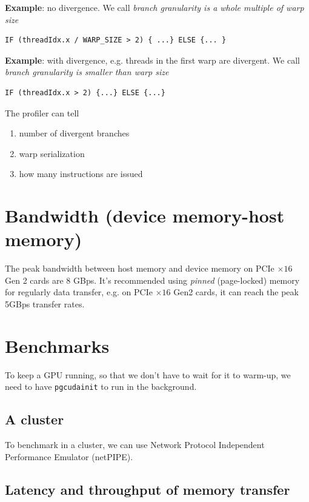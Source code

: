 {\bf Example}: no divergence. We call {\it branch granularity is a
  whole multiple of warp size}
\begin{lstlisting}
IF (threadIdx.x / WARP_SIZE > 2) { ...} ELSE {... }
\end{lstlisting}

{\bf Example}: with divergence, e.g. threads in the first warp are
divergent. We call {\it branch granularity is smaller than warp size}
\begin{lstlisting}
IF (threadIdx.x > 2) {...} ELSE {...}
\end{lstlisting}

The profiler can tell
\begin{enumerate}
\item number of divergent branches
\item warp serialization
\item how many instructions are issued 
\end{enumerate}

\section{Bandwidth (device memory-host memory)}
\label{sec:bandw-device-memory}

The peak bandwidth between host memory and device memory on PCIe
$\times 16$ Gen 2 cards are 8 GBps. It's recommended using
{\it pinned} (page-locked) memory for regularly data transfer, e.g. on
PCIe $\times 16$ Gen2 cards, it can reach the peak 5GBps transfer
rates.


\section{Benchmarks}
\label{sec:benchmarks}

To keep a GPU running, so that we don't have to wait for it to
warm-up, we need to have \verb!pgcudainit! to run in the background. 

\subsection{A cluster}
\label{sec:cluster-1}

To benchmark in a cluster, we can use Network Protocol Independent
Performance Emulator (netPIPE).




\subsection{Latency and throughput of memory transfer}
\label{sec:latency-thro-memory}

